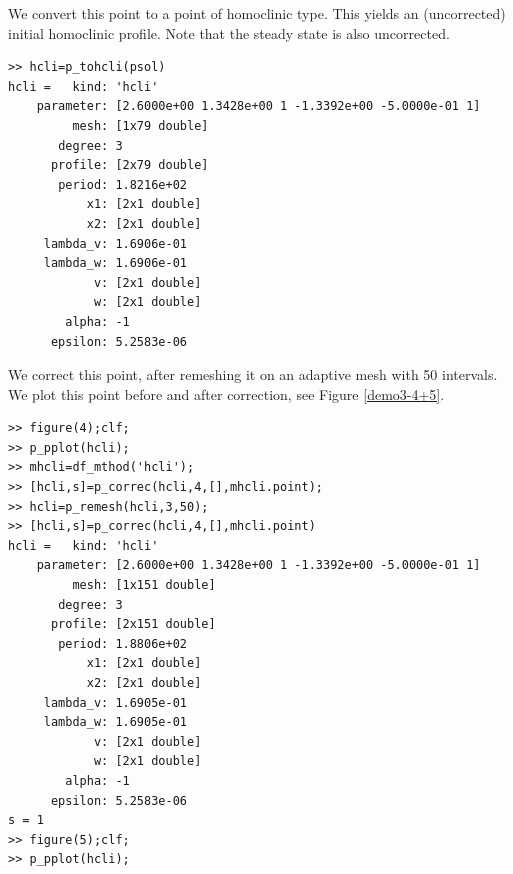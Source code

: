 \documentclass[10pt]{article}
\begin{document}
{We convert this point to a point of homoclinic type. This yields an 
(uncorrected) initial homoclinic profile.  Note that the steady state is also 
uncorrected.
{\small\begin{verbatim}
>> hcli=p_tohcli(psol)
hcli =   kind: 'hcli'
    parameter: [2.6000e+00 1.3428e+00 1 -1.3392e+00 -5.0000e-01 1]
         mesh: [1x79 double]
       degree: 3
      profile: [2x79 double]
       period: 1.8216e+02
           x1: [2x1 double]
           x2: [2x1 double]
     lambda_v: 1.6906e-01
     lambda_w: 1.6906e-01
            v: [2x1 double]
            w: [2x1 double]
        alpha: -1
      epsilon: 5.2583e-06
\end{verbatim}}
We correct this point, after remeshing it on an adaptive mesh
with 50 intervals.  We plot this point before and after correction, 
see Figure \ref{demo3-4+5}.
{\small\begin{verbatim}
>> figure(4);clf;
>> p_pplot(hcli);
>> mhcli=df_mthod('hcli');
>> [hcli,s]=p_correc(hcli,4,[],mhcli.point);
>> hcli=p_remesh(hcli,3,50);
>> [hcli,s]=p_correc(hcli,4,[],mhcli.point)
hcli =   kind: 'hcli'
    parameter: [2.6000e+00 1.3428e+00 1 -1.3392e+00 -5.0000e-01 1]
         mesh: [1x151 double]
       degree: 3
      profile: [2x151 double]
       period: 1.8806e+02
           x1: [2x1 double]
           x2: [2x1 double]
     lambda_v: 1.6905e-01
     lambda_w: 1.6905e-01
            v: [2x1 double]
            w: [2x1 double]
        alpha: -1
      epsilon: 5.2583e-06
s = 1
>> figure(5);clf;
>> p_pplot(hcli);
\end{verbatim}
}
\begin{figure}[ht]
\begin{center}

\end{center}
\end{figure}}
\end{document}
